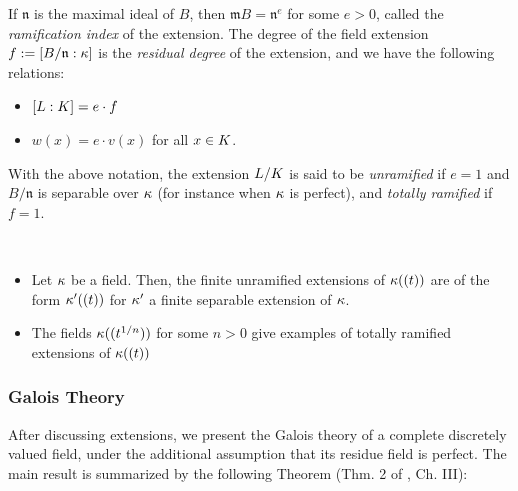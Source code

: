 \documentclass[a4paper, oneside]{memoir}
\begin{document}
If $\mathfrak{n}$ is the maximal ideal of $B$, then $\mathfrak{m}B=\mathfrak{n}^e$ for some $e>0$, called the
\textit{ramification index} of the extension. The degree of the field extension $f:=[B /\mathfrak{n}:\kappa]$
is the \textit{residual degree} of the extension, and we have the following relations:
\begin{itemize}
	\item \( [L:K]=e\cdot f \)
	\item $w(x) = e\cdot v(x)$ for all $x\in K$.
\end{itemize}

\begin{definition}
	With the above notation, the extension $L/K$ is said to be \textit{unramified} if $e=1$ and $B /\mathfrak{n}$ is separable over $\kappa$ (for instance when $\kappa$ is perfect), and \textit{totally ramified} if $f=1$.
\end{definition}

\begin{example}\
	\begin{itemize}
		\item Let $\kappa$ be a field. Then, the finite unramified extensions of $\kappa((t))$ are of the form $\kappa^{\prime}((t))$ for $\kappa^{\prime} $ a finite separable extension of $\kappa$.
		\item The fields $\kappa((t^{1/n}))$ for some $n>0$ give examples of totally ramified extensions of $\kappa((t))$
	\end{itemize}
\end{example}
\subsubsection{Galois Theory}
After discussing extensions, we present the Galois theory of a complete discretely valued field, under the additional assumption that its residue field is perfect. The main result is summarized by the following Theorem (Thm. 2 of \cite{SerreCL}, Ch. III):
\end{document}
